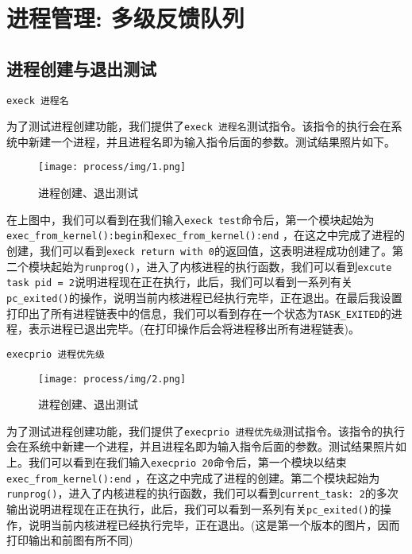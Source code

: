 \section{进程管理: 多级反馈队列}

\subsection{进程创建与退出测试}

\texttt{execk 进程名}

为了测试进程创建功能，我们提供了\texttt{execk 进程名}测试指令。该指令的执行会在系统中新建一个进程，并且进程名即为输入指令后面的参数。测试结果照片如下。

\begin{figure}[H]
  \centering
  \texttt{[image: process/img/1.png]}
  \caption{进程创建、退出测试}
\end{figure}


在上图中，我们可以看到在我们输入\texttt{execk test}命令后，第一个模块起始为 \texttt{exec\_from\_kernel():begin}和\texttt{exec\_from\_kernel():end} ，在这之中完成了进程的创建，我们可以看到\texttt{execk return with 0}的返回值，这表明进程成功创建了。第二个模块起始为\texttt{runprog()}，进入了内核进程的执行函数，我们可以看到\texttt{excute task pid = 2}说明进程现在正在执行，此后，我们可以看到一系列有关\texttt{pc\_exited()}的操作，说明当前内核进程已经执行完毕，正在退出。在最后我设置打印出了所有进程链表中的信息，我们可以看到存在一个状态为\texttt{TASK\_EXITED}的进程，表示进程已退出完毕。(在打印操作后会将进程移出所有进程链表)。



\texttt{execprio 进程优先级}

 

\begin{figure}[H]
  \centering
  \texttt{[image: process/img/2.png]}
  \caption{进程创建、退出测试}
\end{figure}


为了测试进程创建功能，我们提供了\texttt{execprio 进程优先级}测试指令。该指令的执行会在系统中新建一个进程，并且进程名即为输入指令后面的参数。测试结果照片如上。我们可以看到在我们输入\texttt{execprio 20}命令后，第一个模块以结束\texttt{exec\_from\_kernel():end} ，在这之中完成了进程的创建。第二个模块起始为\texttt{runprog()}，进入了内核进程的执行函数，我们可以看到\texttt{current\_task: 2}的多次输出说明进程现在正在执行，此后，我们可以看到一系列有关\texttt{pc\_exited()}的操作，说明当前内核进程已经执行完毕，正在退出。(这是第一个版本的图片，因而打印输出和前图有所不同)

